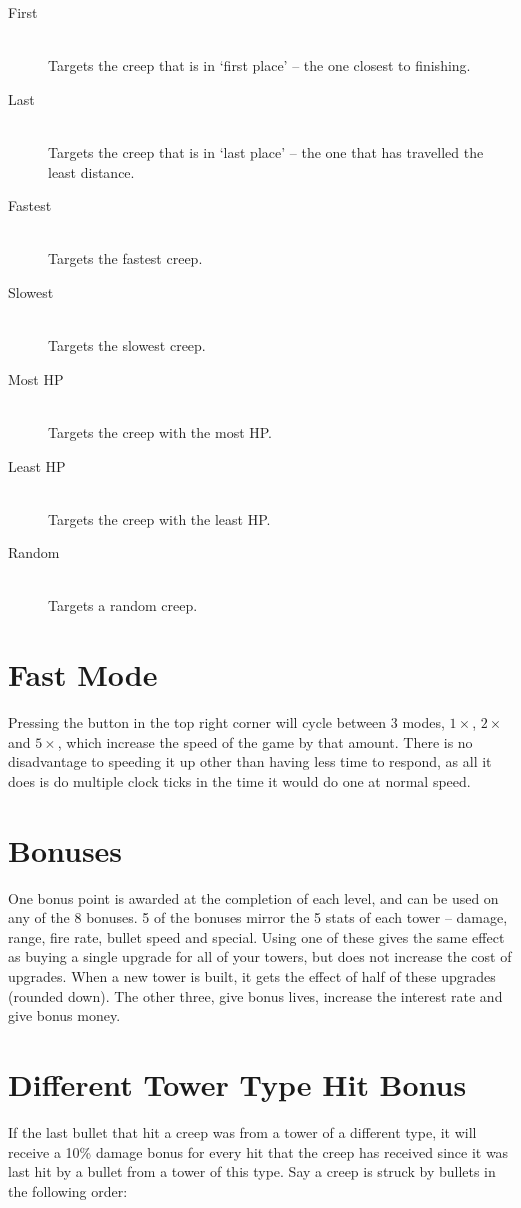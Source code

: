 \documentclass[a4paper,11pt]{article}
\begin{document}
\begin{description}
 \item[First]\quad\\ Targets the creep that is in `first place' -- the one closest to finishing.
 \item[Last]\quad\\ Targets the creep that is in `last place' -- the one that has travelled the least distance.
 \item[Fastest]\quad\\ Targets the fastest creep.
 \item[Slowest]\quad\\ Targets the slowest creep.
 \item[Most HP]\quad\\ Targets the creep with the most HP.
 \item[Least HP]\quad\\ Targets the creep with the least HP.
 \item[Random]\quad\\ Targets a random creep.
\end{description}


\section{Fast Mode}
Pressing the button in the top right corner will cycle between 3 modes, \(1 \times\), \(2 \times\) and \(5 \times\), which increase the speed of the game by that amount. There is no disadvantage to speeding it up other than having less time to respond, as all it does is do multiple clock ticks in the time it would do one at normal speed.

\section{Bonuses}
One bonus point is awarded at the completion of each level, and can be used on any of the 8 bonuses. 5 of the bonuses mirror the 5 stats of each tower -- damage, range, fire rate, bullet speed and special. Using one of these gives the same effect as buying a single upgrade for all of your towers, but does not increase the cost of upgrades. When a new tower is built, it gets the effect of half of these upgrades (rounded down). The other three, give bonus lives, increase the interest rate and give bonus money.

\section{Different Tower Type Hit Bonus}
If the last bullet that hit a creep was from a tower of a different type, it will receive a 10\% damage bonus for every hit that the creep has received since it was last hit by a bullet from a tower of this type. Say a creep is struck by bullets in the following order:
\end{document}
